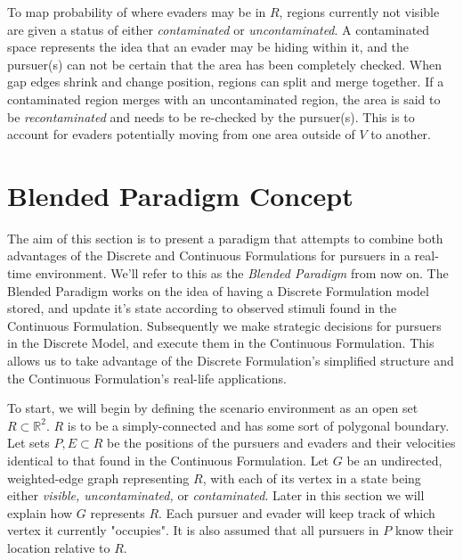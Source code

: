 \documentclass{article}
\begin{document}
To map probability of where evaders may be in \(R\), regions currently not visible are given a status of either \emph{contaminated} or \emph{uncontaminated}. A contaminated space represents the idea that an evader may be hiding within it, and the pursuer(s) can not be certain that the area has been completely checked. When gap edges shrink and change position, regions can split and merge together. If a contaminated region merges with an uncontaminated region, the area is said to be \emph{recontaminated} and needs to be re-checked by the pursuer(s). This is to account for evaders potentially moving from one area outside of \(V\) to another.

\section{Blended Paradigm Concept}
The aim of this section is to present a paradigm that attempts to combine both advantages of the Discrete and Continuous Formulations for pursuers in a real-time environment. We'll refer to this as the \emph{Blended Paradigm} from now on. The Blended Paradigm works on the idea of having a Discrete Formulation model stored, and update it's state according to observed stimuli found in the Continuous Formulation. Subsequently we make strategic decisions for pursuers in the Discrete Model, and execute them in the Continuous Formulation. This allows us to take advantage of the Discrete Formulation's simplified structure and the Continuous Formulation's real-life applications.

To start, we will begin by defining the scenario environment as an open set \(R\subset\mathbb{R}^2\). \(R\) is to be a simply-connected and has some sort of polygonal boundary. Let sets \(P,E\subset{R}\) be the positions of the pursuers and evaders and their velocities identical to that found in the Continuous Formulation. Let \(G\) be an undirected, weighted-edge graph representing \(R\), with each of its vertex in a state being either \emph{visible, uncontaminated,} or \emph{contaminated}. Later in this section we will explain how \(G\) represents \(R\). Each pursuer and evader will keep track of which vertex it currently "occupies". It is also assumed that all pursuers in \(P\) know their location relative to \(R\).
\end{document}
